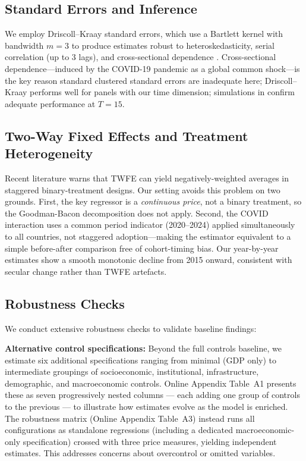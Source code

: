 \subsection{Standard Errors and Inference}

We employ Driscoll--Kraay \citeyearpar{driscoll1998consistent} standard errors, which use a Bartlett kernel with bandwidth $m=3$ to produce estimates robust to heteroskedasticity, serial correlation (up to 3 lags), and cross-sectional dependence \citep{petersen2009estimating, cameron2015practitioner}. Cross-sectional dependence---induced by the COVID-19 pandemic as a global common shock---is the key reason standard clustered standard errors are inadequate here; Driscoll--Kraay performs well for panels with our time dimension; simulations in \citet{hoechle2007robust} confirm adequate performance at $T=15$.

\subsection{Two-Way Fixed Effects and Treatment Heterogeneity}

Recent literature \citep{goodman2021difference, de2020two} warns that TWFE can yield negatively-weighted averages in staggered binary-treatment designs. Our setting avoids this problem on two grounds. First, the key regressor is a \textit{continuous price}, not a binary treatment, so the Goodman-Bacon decomposition does not apply. Second, the COVID interaction uses a common period indicator (2020--2024) applied simultaneously to all countries, not staggered adoption---making the estimator equivalent to a simple before-after comparison free of cohort-timing bias. Our year-by-year estimates show a smooth monotonic decline from 2015 onward, consistent with secular change rather than TWFE artefacts.

\subsection{Robustness Checks}

We conduct extensive robustness checks to validate baseline findings:

\textbf{Alternative control specifications:} Beyond the full controls baseline, we estimate six additional specifications ranging from minimal (GDP only) to intermediate groupings of socioeconomic, institutional, infrastructure, demographic, and macroeconomic controls. Online Appendix Table~A1 presents these as seven progressively nested columns --- each adding one group of controls to the previous --- to illustrate how estimates evolve as the model is enriched. The robustness matrix (Online Appendix Table~A3) instead runs all \NPerMeasure{} configurations as standalone regressions (including a dedicated macroeconomic-only specification) crossed with three price measures, yielding \RobNSpecs{} independent estimates. This addresses concerns about overcontrol or omitted variables.

